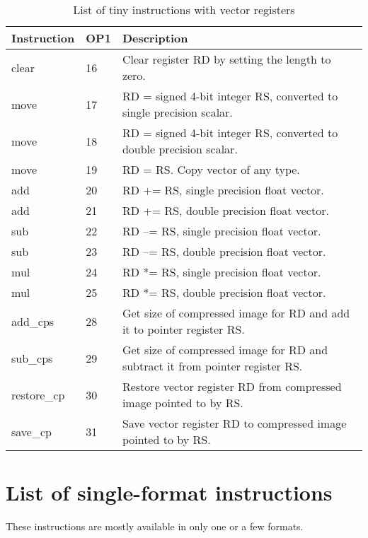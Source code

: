 \documentclass[forwardcom.tex]{subfiles}
\begin{document}
\begin{longtable} {|p{20mm}|p{8mm}|p{80mm}|}
\caption{List of tiny instructions with vector registers}
\label{table:tinyInstructionsVector}  \\
\endfirsthead
\endhead
\hline
\bfseries Instruction & \bfseries OP1 & \bfseries Description \\
\hline
clear         & 16 & Clear register RD by setting the length to zero. \\
move          & 17 & RD = signed 4-bit integer RS, converted to single precision scalar. \\
move          & 18 & RD = signed 4-bit integer RS, converted to double precision scalar. \\
move          & 19 & RD = RS. Copy vector of any type. \\
add           & 20 & RD += RS, single precision float vector. \\
add           & 21 & RD += RS, double precision float vector. \\
sub           & 22 & RD --= RS, single precision float vector. \\
sub           & 23 & RD --= RS, double precision float vector. \\
mul           & 24 & RD *= RS, single precision float vector. \\
mul           & 25 & RD *= RS, double precision float vector. \\
add\_cps      & 28 & Get size of compressed image for RD and add it to pointer register RS. \\
sub\_cps      & 29 & Get size of compressed image for RD and subtract it from pointer register RS. \\
restore\_cp   & 30 & Restore vector register RD from compressed image pointed to by RS. \\
save\_cp      & 31 & Save vector register RD to compressed image pointed to by RS. \\
\hline
\end{longtable}
\vspace{2mm}

\section{List of single-format instructions}
These instructions are mostly available in only one or a few formats.
\end{document}
